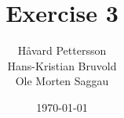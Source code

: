 \newcommand{\mytitle}{Exercise 3}
\newcommand{\mygroupnumber}{12}
\newcommand{\myauthor}{Håvard Pettersson\\Hans-Kristian Bruvold\\Ole Morten Saggau}

\title{\mytitle}
\author{\myauthor}
\date{\today}
